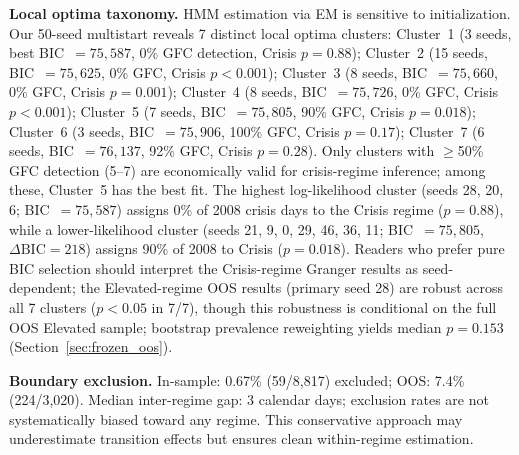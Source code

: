 \documentclass[sigconf,anonymous]{acmart}
\begin{document}
\textbf{Local optima taxonomy.}
HMM estimation via EM is sensitive to initialization. Our 50-seed multistart
reveals 7 distinct local optima clusters:
Cluster~1 (3 seeds, best BIC~$= 75{,}587$, 0\% GFC detection, Crisis $p = 0.88$);
Cluster~2 (15 seeds, BIC~$= 75{,}625$, 0\% GFC, Crisis $p < 0.001$);
Cluster~3 (8 seeds, BIC~$= 75{,}660$, 0\% GFC, Crisis $p = 0.001$);
Cluster~4 (8 seeds, BIC~$= 75{,}726$, 0\% GFC, Crisis $p < 0.001$);
Cluster~5 (7 seeds, BIC~$= 75{,}805$, 90\% GFC, Crisis $p = 0.018$);
Cluster~6 (3 seeds, BIC~$= 75{,}906$, 100\% GFC, Crisis $p = 0.17$);
Cluster~7 (6 seeds, BIC~$= 76{,}137$, 92\% GFC, Crisis $p = 0.28$).
Only clusters with $\geq$50\% GFC detection (5--7) are economically valid for
crisis-regime inference; among these, Cluster~5 has the best fit.
The highest log-likelihood cluster (seeds 28, 20, 6; BIC~$= 75{,}587$)
assigns 0\% of 2008 crisis days to the Crisis regime ($p = 0.88$),
while a lower-likelihood cluster (seeds 21, 9, 0, 29, 46, 36, 11;
BIC~$= 75{,}805$, $\Delta\text{BIC} = 218$) assigns 90\% of 2008 to Crisis
($p = 0.018$). Readers who prefer pure BIC selection should interpret the
Crisis-regime Granger results as seed-dependent; the Elevated-regime OOS results
(primary seed 28) are robust across all 7 clusters ($p < 0.05$ in 7/7),
though this robustness is conditional on the full OOS Elevated sample;
bootstrap prevalence reweighting yields median $p = 0.153$
(Section~\ref{sec:frozen_oos}).

\textbf{Boundary exclusion.}
In-sample: 0.67\% (59/8{,}817) excluded; OOS: 7.4\% (224/3{,}020).
Median inter-regime gap: 3 calendar days; exclusion rates are not
systematically biased toward any regime. This conservative approach
may underestimate transition effects but ensures clean within-regime estimation.


\end{document}
